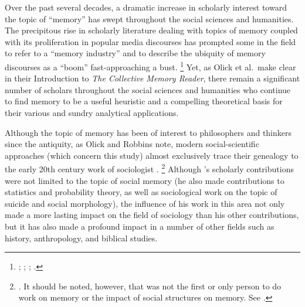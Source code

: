 

Over the past several decades, a dramatic increase in scholarly interest toward the topic of ``memory'' has swept throughout the social sciences and humanities. The precipitous rise in scholarly literature dealing with topics of memory coupled with its proliferation in popular media discourses has prompted some in the field to refer to a ``memory industry'' and to describe the ubiquity of memory discourses as a ``boom'' fast-approaching a bust.%
%
\footnote{\cite{rosenfeld_jmh2009}; \cite{winter2006}; \cite{berliner_aq2005}; \cite{confino_ahr1997}.}
%
Yet, as Olick et al.~make clear in their Introduction to \emph{The Collective Memory Reader}, there remain a significant number of scholars throughout the social sciences and humanities who continue to find memory to be a useful heuristic and a compelling theoretical basis for their various and sundry analytical applications.\autocite[3--6]{olick_olick-etal2011}  

Although the topic of memory has been of interest to philosophers and thinkers since the antiquity,\autocite{carruthers_radstone-schwarz2011} as Olick and Robbins note, modern social-scientific approaches (which concern this study) almost exclusively trace their genealogy to the early 20th century work of sociologist \Halbwachs.%
%
\footnote{\cites[106]{olick-robbins_ars1998}. It should be noted, however, that \halbwachs was not the first or only person to do work on memory or the impact of social structures on memory. See \cite[8--36]{olick_olick-etal2011}.}
%
Although \halbwachs's scholarly contributions were not limited to the topic of social memory (he also made contributions to statistics and probability theory, as well as sociological work on the topic of suicide and social morphology), the influence of his work in this area not only made a more lasting impact on the field of sociology than his other contributions, but it has also made a profound impact in a number of other fields such as history, anthropology, and biblical studies.\autocite[13--20]{coser_halbwachs1992} 

